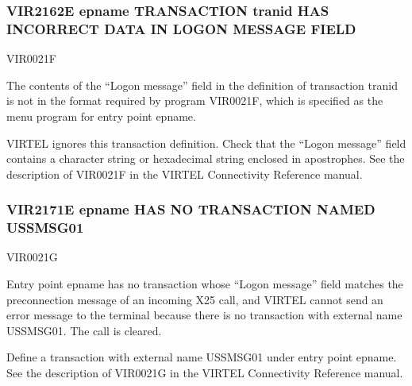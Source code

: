 \documentclass[letterpaper,10pt,english]{sphinxmanual}
\begin{document}
\subsubsection{VIR2162E epname TRANSACTION tranid HAS INCORRECT DATA IN LOGON MESSAGE FIELD}
\label{\detokenize{messages:vir2162e-epname-transaction-tranid-has-incorrect-data-in-logon-message-field}}\begin{description}
\sphinxAtStartPar
VIR0021F

\sphinxAtStartPar
The contents of the “Logon message” field in the definition of transaction tranid is not in the format required by program VIR0021F, which is specified as the menu program for entry point epname.

\sphinxAtStartPar
VIRTEL ignores this transaction definition. Check that the “Logon message” field contains a character string or hexadecimal string enclosed in apostrophes. See the description of VIR0021F in the VIRTEL Connectivity Reference manual.

\end{description}


\subsubsection{VIR2171E epname HAS NO TRANSACTION NAMED USSMSG01}
\label{\detokenize{messages:vir2171e-epname-has-no-transaction-named-ussmsg01}}\begin{description}
\sphinxAtStartPar
VIR0021G

\sphinxAtStartPar
Entry point epname has no transaction whose “Logon message” field matches the preconnection message of an incoming X25 call, and VIRTEL cannot send an error message to the terminal because there is no transaction with external name USSMSG01. The call is cleared.

\sphinxAtStartPar
Define a transaction with external name USSMSG01 under entry point epname. See the description of VIR0021G in the VIRTEL Connectivity Reference manual.

\end{description}
\end{document}
